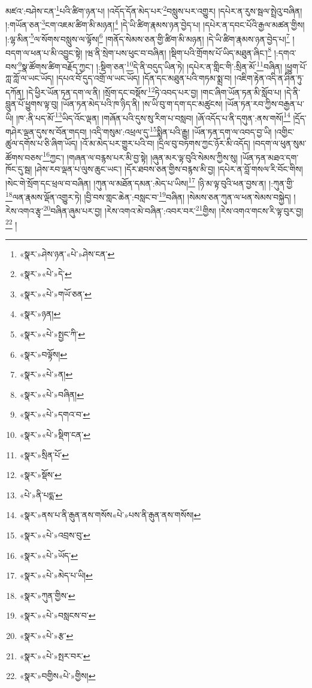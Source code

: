 མཛའ་:བཤེས་ངན་\footnote{«སྣར་»ཤེས་ཉན་«པེ་»ཤེས་ངན་}པའི་ཚིག་ཉན་པ། །འདོད་དོན་མེད་པར་\footnote{«སྣར་»«པེ་»དེ་}བསླུས་པར་འགྱུར། །དཔེར་ན་རུས་སྦལ་སྤྲེའུ་བཞིན། །:གཡོན་ཅན་\footnote{«སྣར་»«པེ་»གཡོ་ཅན་}ངག་འཇམ་ཚིག་མི་མཉན།\footnote{«སྣར་»ཉན།} །དེ་ཡི་ཚིག་རྣམས་ཉན་བྱེད་པ། །དཔེར་ན་དབང་པོའི་རྒྱལ་མཚན་གྱིས། །:ལྷ་མིན་\footnote{«སྣར་»«པེ་»སྤྱང་ཀི་}ལ་སོགས་བསླུས་ལ་ལྟོས།\footnote{«སྣར་»བལྟོས།} །གནོད་སེམས་ཅན་གྱི་ཚིག་མི་མཉན། །དེ་ཡི་ཚིག་རྣམས་ཉན་བྱེད་པ།\footnote{«སྣར་»«པེ་»ན།} །བདག་ལ་ཕན་པ་མི་འབྱུང་སྟེ། །ཝ་ནི་སྲེག་པས་ཕུང་བ་བཞིན། །སྡིག་པའི་གྲོགས་པོ་ཡིད་མཐུན་ཞིང་།\footnote{«སྣར་»«པེ་»བཞིན།} །:དགའ་བས་\footnote{«སྣར་»«པེ་»དགའ་བ་}སྣ་ཚོགས་ཚིག་བརྗོད་ཀྱང་། །:སྡིག་ཅན་\footnote{«སྣར་»«པེ་»སྡིག་ངན་}དེ་ནི་བདུད་ཡིན་ཏེ། །དཔེར་ན་གླིང་གི་:སྲིན་མོ་\footnote{«སྣར་»སྲིན་པོ་}བཞིན། །ཕྱུག་པོ་ཀླ་ཀློ་ལ་ཡང་ཡོད། །དཔའ་བོ་དུད་འགྲོ་ལ་ཡང་ཡོད། །དོན་དང་མཐུན་པའི་གཏམ་སྨྲ་བ། །འཇིག་རྟེན་འདི་ན་ཤིན་ཏུ་དཀོན། །དེ་ཕྱིར་ཡོན་ཏན་དག་ལ་ནི། །སྲོག་དང་བསྡོས་\footnote{«སྣར་»སྡོས་}ཏེ་འབད་པར་བྱ། །གང་ཞིག་ཡོན་ཏན་མི་སློབ་པ། །དེ་ནི་བླུན་པོ་ཕྱུགས་ལྟ་བུ། །ཡོན་ཏན་མེད་པའི་ཁ་ཉིད་ནི། །ས་ཡི་བུ་ག་དག་དང་མཚུངས། །ཡོན་ཏན་རབ་ཀྱིས་བརྒྱན་པ་ཡི། །ཁ་:ནི་པད་མོ་\footnote{«པེ་»ནི་པདྨ་}ཡིད་འོང་ལྡན། །གཞོན་པའི་དུས་སུ་རིག་པ་བསླབ། །ཞོ་འདོད་པ་ནི་དགུན་:ནས་གསོ།\footnote{«སྣར་»ནས་པ་ནི་རྒུན་ནས་གསོས«པེ་»པས་ནི་རྒུན་ནས་གསོས།} །དྲོད་གཤེར་ལྡན་དུས་ས་བོན་གདབ། །འདི་གསུམ་:འཕྲལ་དུ་\footnote{«སྣར་»«པེ་»འབྲས་བུ་}སྨིན་པའི་རྒྱུ། །ཡོན་ཏན་དག་ལ་འབད་བྱ་ཡི། །འགྱིང་ཚུལ་དགོས་པ་ཅི་ཞིག་ཡོད། །འོ་མ་མེད་པར་གྱུར་པའི་བ། །དྲིལ་བུ་བཏགས་ཀྱང་ཉོར་མི་འདོད། །བདག་ལ་ཕུན་སུམ་ཚོགས་བཅས་\footnote{«སྣར་»«པེ་»ཡོད་}ཀྱང་། །གཞན་ལ་བརྙས་པར་མི་བྱ་སྟེ། །ཞུན་མར་ལྟ་བུའི་སེམས་ཀྱིས་སུ། །ཡོན་ཏན་མཐའ་དག་ཁོང་དུ་སྦ། །ཤེས་རབ་ལྡན་པ་ལུས་ཆུང་ཡང་། །དོར་ཐབས་ཅན་གྱིས་བརྙས་མི་བྱ། །དཔེར་ན་བློ་གསལ་རི་བོང་གིས། །སེང་གེ་སྲོག་དང་ཕྲལ་བ་བཞིན། །ཀུན་ལ་མཐོན་དམན་:མེད་པ་ཡིས།\footnote{«སྣར་»«པེ་»མེད་པ་ཡི།} །ཉི་མ་ལྟ་བུའི་ཕན་བྱས་ན། །:ཀུན་གྱི་\footnote{«སྣར་»ཀུན་གྱིས་}ལན་རྣམས་ལྡོན་འགྱུར་ཏེ། །བྱི་བས་གླང་ཆེན་:བསླང་བ་\footnote{«སྣར་»«པེ་»བསླངས་བ་}བཞིན། །སེམས་ཅན་ཀུན་ལ་ཕན་སེམས་བསྐྱེད། །རེས་འགའ་རྩྭ་\footnote{«སྣར་»«པེ་»རྩ་}བཞིན་ཞུམ་པར་བྱ། །རེས་འགའ་མེ་བཞིན་:འབར་བར་\footnote{«སྣར་»«པེ་»སྤར་བར་}གྱིས། །རེས་འགའ་གངས་རི་ལྟ་བུར་བྱ།\footnote{«སྣར་»བགྱིས«པེ་»གྱིས།} །
